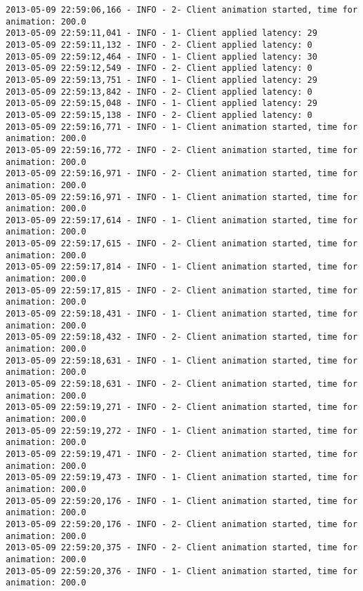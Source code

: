 \begin{verbatim}
2013-05-09 22:59:06,166 - INFO - 2- Client animation started, time for animation: 200.0
2013-05-09 22:59:11,041 - INFO - 1- Client applied latency: 29
2013-05-09 22:59:11,132 - INFO - 2- Client applied latency: 0
2013-05-09 22:59:12,464 - INFO - 1- Client applied latency: 30
2013-05-09 22:59:12,549 - INFO - 2- Client applied latency: 0
2013-05-09 22:59:13,751 - INFO - 1- Client applied latency: 29
2013-05-09 22:59:13,842 - INFO - 2- Client applied latency: 0
2013-05-09 22:59:15,048 - INFO - 1- Client applied latency: 29
2013-05-09 22:59:15,138 - INFO - 2- Client applied latency: 0
2013-05-09 22:59:16,771 - INFO - 1- Client animation started, time for animation: 200.0
2013-05-09 22:59:16,772 - INFO - 2- Client animation started, time for animation: 200.0
2013-05-09 22:59:16,971 - INFO - 2- Client animation started, time for animation: 200.0
2013-05-09 22:59:16,971 - INFO - 1- Client animation started, time for animation: 200.0
2013-05-09 22:59:17,614 - INFO - 1- Client animation started, time for animation: 200.0
2013-05-09 22:59:17,615 - INFO - 2- Client animation started, time for animation: 200.0
2013-05-09 22:59:17,814 - INFO - 1- Client animation started, time for animation: 200.0
2013-05-09 22:59:17,815 - INFO - 2- Client animation started, time for animation: 200.0
2013-05-09 22:59:18,431 - INFO - 1- Client animation started, time for animation: 200.0
2013-05-09 22:59:18,432 - INFO - 2- Client animation started, time for animation: 200.0
2013-05-09 22:59:18,631 - INFO - 1- Client animation started, time for animation: 200.0
2013-05-09 22:59:18,631 - INFO - 2- Client animation started, time for animation: 200.0
2013-05-09 22:59:19,271 - INFO - 2- Client animation started, time for animation: 200.0
2013-05-09 22:59:19,272 - INFO - 1- Client animation started, time for animation: 200.0
2013-05-09 22:59:19,471 - INFO - 2- Client animation started, time for animation: 200.0
2013-05-09 22:59:19,473 - INFO - 1- Client animation started, time for animation: 200.0
2013-05-09 22:59:20,176 - INFO - 1- Client animation started, time for animation: 200.0
2013-05-09 22:59:20,176 - INFO - 2- Client animation started, time for animation: 200.0
2013-05-09 22:59:20,375 - INFO - 2- Client animation started, time for animation: 200.0
2013-05-09 22:59:20,376 - INFO - 1- Client animation started, time for animation: 200.0
\end{verbatim}
